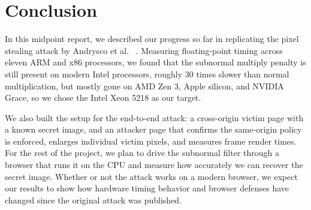 \section{Conclusion}

In this midpoint report, we described our progress so far in replicating the pixel stealing attack by Andrysco et al. ~\cite{andrysco2015subnormal}. Measuring floating-point timing across eleven ARM and x86 processors, we found that the subnormal multiply penalty is still present on modern Intel processors, roughly 30 times slower than normal multiplication, but mostly gone on AMD Zen 3, Apple silicon, and NVIDIA Grace, so we chose the Intel Xeon 5218 as our target.

We also built the setup for the end-to-end attack: a cross-origin victim page with a known secret image, and an attacker page that confirms the same-origin policy is enforced, enlarges individual victim pixels, and measures frame render times. For the rest of the project, we plan to drive the subnormal filter through a browser that runs it on the CPU and measure how accurately we can recover the secret image. Whether or not the attack works on a modern browser, we expect our results to show how hardware timing behavior and browser defenses have changed since the original attack was published.
